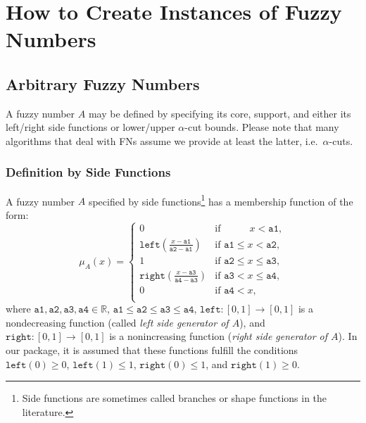 \documentclass[11pt]{article}\usepackage{graphicx, color}
\begin{document}





\section{How to Create Instances of Fuzzy Numbers}


\subsection{Arbitrary Fuzzy Numbers}

A fuzzy number $A$ may be defined by specifying
its core, support, and either its left/right side functions
or lower/upper $\alpha$-cut bounds. Please note that many algorithms that
deal with FNs assume we provide at least the latter, i.e.~$\alpha$-cuts.

\subsubsection{Definition by Side Functions}

A fuzzy number $A$ specified by side functions\footnote{Side functions
  are sometimes called branches or shape functions in the literature.}
has a membership function
of the form:
\begin{equation}
\mu_A(x) = \left\{\begin{array}{ll}
0 & \text{if } \phantom{\mathtt{a2}\le\ } x<\mathtt{a1}, \\
\mathtt{left}\left( \frac{x-\mathtt{a1}}{\mathtt{a2-a1}} \right)  & \text{if } \mathtt{a1} \le x < \mathtt{a2}, \\
1 & \text{if } \mathtt{a2}\le x\le\mathtt{a3}, \\
\mathtt{right}\left( \frac{x-\mathtt{a3}}{\mathtt{a4-a3}} \right)  & \text{if } \mathtt{a3} < x \le \mathtt{a4}, \\
0 & \text{if } \mathtt{a4}<x, \\
\end{array}\right.
\end{equation}
where $\mathtt{a1},\mathtt{a2},\mathtt{a3},\mathtt{a4}\in\mathbb{R}$,
$\mathtt{a1}\le\mathtt{a2}\le\mathtt{a3}\le\mathtt{a4}$,
$\mathtt{left}: [0,1]\to[0,1]$ is a nondecreasing function
(called \textit{left side generator of $A$}),
and $\mathtt{right}: [0,1]\to[0,1]$ is a nonincreasing function
(\textit{right side generator of $A$}).
In our package, it is assumed that these functions fulfill the conditions
$\mathtt{left}(0)\ge 0$, $\mathtt{left}(1)\le 1$,
$\mathtt{right}(0)\le 1$, and $\mathtt{right}(1)\ge 0$.
\end{document}
